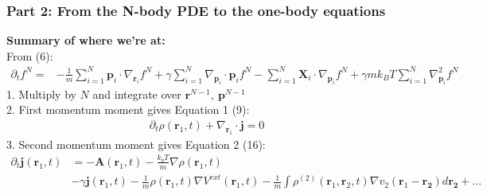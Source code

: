 \documentclass[aspectratio=169,xcolor=dvipsnames]{beamer}
\begin{document}
\begin{frame}
	\frametitle{Part 2: From the N-body PDE to the one-body equations}
	\textbf{Summary of where we're at:}\\
	From (6):
	\begin{align*}
	\partial_t f^N = &- \frac{1}{m} \sum_{i=1}^N \mathbf{p}_i \cdot \nabla_{\mathbf{r}_i} f^N + \gamma \sum_{i = 1}^N \nabla_{\mathbf{p}_i}
	\cdot \mathbf{p}_i f^N - \sum_{i=1}^N \mathbf{X}_i \cdot \nabla_{\mathbf{p}_i}f^N + \gamma m k_BT \sum_{i=1}^N \nabla^2_{\mathbf{p}_i}f^N	
	\end{align*}
1. Multiply by $N$ and integrate over $\mathbf{r}^{N-1}, \ \mathbf{p}^{N-1}$\\
2. First momentum moment gives Equation 1 (9):
\begin{align*}
{\partial_t \rho(\mathbf{r}_1,t)} + {\nabla_{\mathbf{r}_1} \cdot \mathbf{j}} = 0
\end{align*}
3. Second momentum moment gives Equation 2 (16):
	\begin{align*}
	\partial_t \mathbf{j}(\mathbf{r}_1,t) &=- {\mathbf{A}(\mathbf{r}_1,t)}  -\frac{k_bT}{m} \nabla \rho (\mathbf{r}_1,t)\\
	&- \gamma \mathbf{j}(\mathbf{r}_1,t) -\frac{1}{m} \rho(\mathbf{r}_1,t) \nabla V^{ext}(\mathbf{r}_1,t) - \frac{1}{m} \int \rho^{(2)}(\mathbf{r}_1, \mathbf{r}_2,t) \nabla v_2(\mathbf{r}_1 - \mathbf{r_2}) d \mathbf{r_2} + ...
	\end{align*}
\end{frame}
\end{document}
